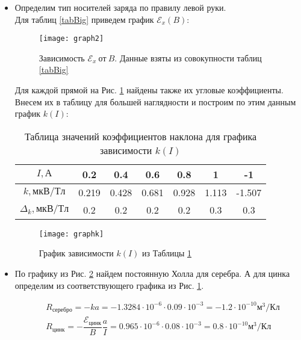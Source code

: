 \documentclass{lab}
\begin{document}
\begin{itemize}
\item
Определим тип носителей заряда по правилу левой руки.\\
Для таблиц \ref{tabBig} приведем график $ \mathscr{E}_x(B) $:

\begin{figure}[H]
	\centering
	\texttt{[image: graph2]}
	\caption{\footnotesize Зависимость $\mathscr{E}_x~от~B$. Данные взяты из совокупности таблиц \ref{tabBig}}
	\label{mnogo}
\end{figure}

Для каждой прямой на Рис. \ref{mnogo} найдены также их угловые коэффициенты. Внесем их в таблицу для
большей наглядности и построим по этим данным график $ k(I) $:

\begin{table}[H]
	\centering
	\renewcommand{\arraystretch}{1.3}
	\begin{tabular}{|c|cccccc|}
		\hline
		$ I, А $				& 0.2	& 0.4	& 0.6	& 0.8	& 1		& -1	\\ \hline
		$ k, мкВ/Тл $			& 0.219	& 0.428 & 0.681 & 0.928 & 1.113 & -1.507	\\ \hline
		$ \Delta_k, мкВ/Тл $	& 0.2	& 0.2	& 0.2	& 0.2	& 0.3	& 0.3 \\ \hline
	\end{tabular}
	\renewcommand{\arraystretch}{1}
	\caption{\footnotesize Таблица значений коэффициентов наклона для графика зависимости $k(I)$}
	\label{tabk}
\end{table}

\begin{figure}[H]
	\centering
	\texttt{[image: graphk]}
	\caption{\footnotesize  График зависимости $k(I)$ из Таблицы \ref{tabk}}
	\label{ki}
\end{figure}

\item
По графику из Рис. \ref{ki} найдем постоянную Холла для серебра.
А для цинка определим из соответствующего графика из Рис. \ref{mnogo}.

\begin{equation}
\begin{aligned}
	&R_{серебро} = -ka = - 1.3284 \cdot 10^{-6} \cdot 0.09 \cdot 10^{-3} = -1.2 \cdot 10^{-10} м^3/Кл\\
	&R_{цинк} = - \dfrac{\mathscr{E}_{цинк}}{B} \dfrac{a}{I} = 0.965 \cdot 10^{-6} \cdot 0.08 \cdot 10^{-3} = 0.8 \cdot 10^{-10} м^3/Кл
\end{aligned}
\end{equation}


\end{itemize}
\end{document}
